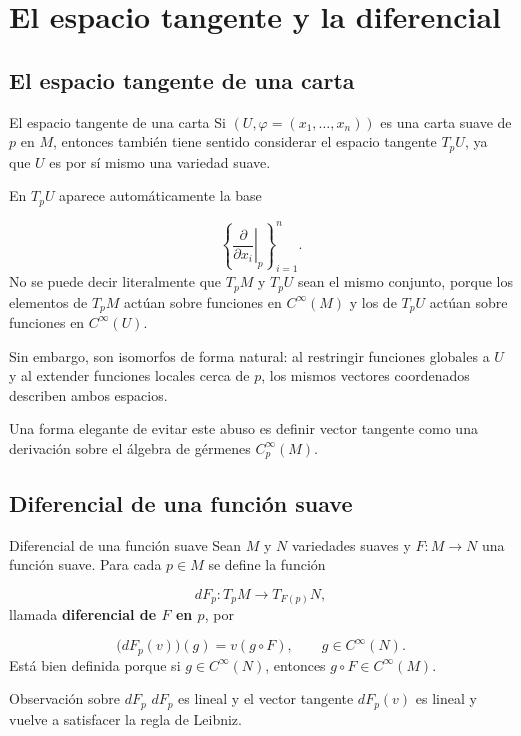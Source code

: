 \chapter{El espacio tangente y la diferencial}
\label{ch:teo-6}
\section{El espacio tangente de una carta}
\begin{bookremark}{El espacio tangente de una carta}
Si $(U,\varphi=(x_1,\dots,x_n))$ es una carta suave de $p$ en $M$, entonces también tiene sentido considerar el espacio tangente $T_pU$, ya que $U$ es por sí mismo una variedad suave.

En $T_pU$ aparece automáticamente la base

\[
\left\{\left.\frac{\partial}{\partial x_i}\right|_p\right\}_{i=1}^n.
\]
No se puede decir literalmente que $T_pM$ y $T_pU$ sean el mismo conjunto, porque los elementos de $T_pM$ actúan sobre funciones en $C^\infty(M)$ y los de $T_pU$ actúan sobre funciones en $C^\infty(U)$.

Sin embargo, son isomorfos de forma natural: al restringir funciones globales a $U$ y al extender funciones locales cerca de $p$, los mismos vectores coordenados describen ambos espacios.

Una forma elegante de evitar este abuso es definir vector tangente como una derivación sobre el álgebra de gérmenes $C_p^\infty(M)$.

\end{bookremark}
\section{Diferencial de una función suave}
\begin{bookdefinition}{Diferencial de una función suave}
Sean $M$ y $N$ variedades suaves y $F:M\to N$ una función suave. Para cada $p\in M$ se define la función

\[
dF_p:T_pM\to T_{F(p)}N,
\]
llamada \textbf{diferencial de $F$ en $p$}, por

\[
\bigl(dF_p(v)\bigr)(g)=v(g\circ F),\qquad g\in C^\infty(N).
\]
Está bien definida porque si $g\in C^\infty(N)$, entonces $g\circ F\in C^\infty(M)$.

\end{bookdefinition}
\begin{bookexercise}{Observación sobre $dF_p$}
$dF_p$ es lineal y el vector tangente $dF_p(v)$ es lineal y vuelve a satisfacer la regla de Leibniz.

\end{bookexercise}
